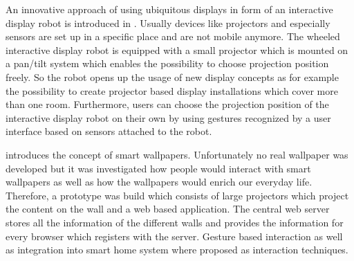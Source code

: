 

An innovative approach of using ubiquitous displays in form of an interactive display robot is introduced in \cite{Choi2013}. Usually devices like projectors and especially sensors are set up in a specific place and are not mobile anymore. The wheeled interactive display robot is equipped with a small projector which is mounted on a pan/tilt system which enables the possibility to choose projection position freely. So the robot opens up the usage of new display concepts as for example the possibility to create projector based display installations which cover more than one room. Furthermore, users can choose the projection position of the interactive display robot on their own by using gestures recognized by a user interface based on sensors attached to the robot. 

\cite{Campbell2014} introduces the concept of smart wallpapers. Unfortunately no real wallpaper was developed but it was investigated how people would interact with smart wallpapers as well as how the wallpapers would enrich our everyday life. Therefore, a prototype was build which consists of large projectors which project the content on the wall and a web based application. The central web server stores all the information of the different walls and provides the information for every browser which registers with the server. Gesture based interaction as well as integration into smart home system where proposed as interaction techniques.

